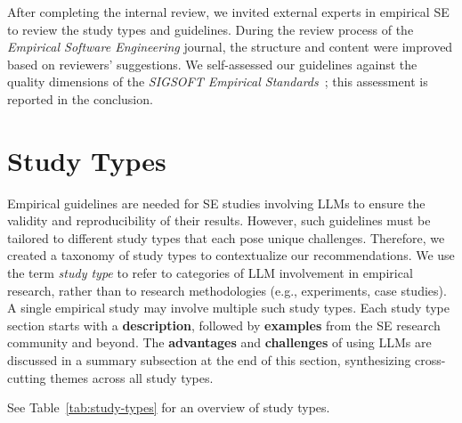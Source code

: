 \documentclass[smallextended]{svjour3}
\newif\ifpaper\papertrue
\begin{document}
After completing the internal review, we invited external experts in empirical SE to review the study types and guidelines.
During the review process of the \emph{Empirical Software Engineering} journal, the structure and content were improved based on reviewers' suggestions.
We self-assessed our guidelines against the quality dimensions of the \emph{SIGSOFT Empirical Standards}~\citep{ralph2021empiricalstandardssoftwareengineering}; this assessment is reported in the conclusion.


\section{Study Types}
\label{sec:study-types}

Empirical guidelines are needed for SE studies involving LLMs to ensure the validity and reproducibility of their results.
However, such guidelines must be tailored to different study types that each pose unique challenges.
Therefore, we created a taxonomy of study types to contextualize our recommendations.
We use the term \emph{study type} to refer to categories of LLM involvement in empirical research, rather than to research methodologies (e.g., experiments, case studies). A single empirical study may involve multiple such study types.
Each study type section starts with a \textbf{description}, followed by \textbf{examples} from the SE research community and beyond. The \textbf{advantages} and \textbf{challenges} of using LLMs are discussed in a summary subsection at the end of this section, synthesizing cross-cutting themes across all study types.
\ifpaper
See Table~\ref{tab:study-types} for an overview of study types.
\fi
 
\end{document}
